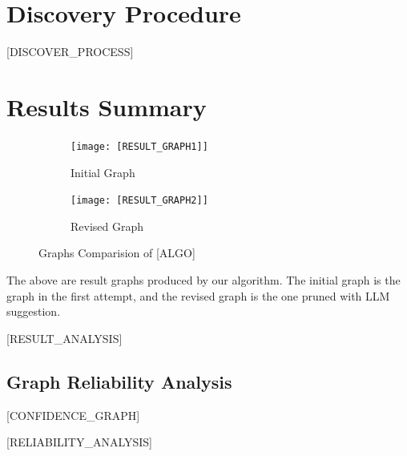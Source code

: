\documentclass{article}
\begin{document}
\section{Discovery Procedure}
[DISCOVER_PROCESS]

\section{Results Summary}

\begin{figure}[H]
    \centering
    \begin{subfigure}{0.45\textwidth}
        \centering
        \vspace{-0.5cm}
        \texttt{[image: [RESULT\_GRAPH1]]}
        \vfill
        \caption{Initial Graph}
        \label{fig:sub2}
    \end{subfigure}
    \hspace{0.04\textwidth}
    \begin{subfigure}{0.45\textwidth}
        \centering
        \vspace{-0.5cm}
        \texttt{[image: [RESULT\_GRAPH2]]}
        \vfill
        \caption{Revised Graph}
        \label{fig:sub3}
    \end{subfigure}
    \caption{Graphs Comparision of [ALGO]}
    \label{fig:main}
\end{figure}

The above are result graphs produced by our algorithm.
The initial graph is the graph in the first attempt, and the revised graph is the one pruned with LLM suggestion.

[RESULT_ANALYSIS]

\subsection{Graph Reliability Analysis}

[CONFIDENCE_GRAPH]

[RELIABILITY_ANALYSIS]

\end{document}
